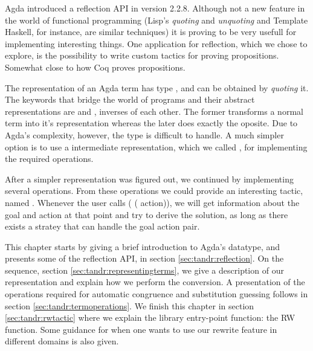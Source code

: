 
Agda introduced a reflection API in version 2.2.8. Although not a new feature
in the world of functional programming (Lisp's \emph{quoting} and \emph{unquoting} 
and Template Haskell, for instance, are similar techniques) 
it is proving to be very usefull for implementing interesting things. 
One application for reflection, which we chose to explore, is 
the possibility to write custom tactics for proving propositions. 
Somewhat close to how Coq proves propositions.

The representation of an Agda term has type , and can be obtained
by \emph{quoting} it.
The keywords that bridge the world of programs and their abstract representations 
are  and , inverses of each other. 
The former transforms a normal term into it's  representation whereas the 
later does exactly the oposite. Due to Agda's complexity, however, the type  is difficult
to handle. A much simpler option is to use a intermediate representation, which we called ,
for implementing the required operations.

After a simpler representation was figured out, we continued by implementing several
 operations. From these operations we could provide an interesting tactic,
named . Whenever the user calls ( ( action)), we will get information
about the goal and action at that point and try to derive the solution, as long as there exists
a stratey that can handle the goal action pair.

This chapter starts by giving a brief introduction to Agda's  datatype, and presents some
of the reflection API, in section \ref{sec:tandr:reflection}. 
On the sequence, section \ref{sec:tandr:representingterms}, we give a description of our  representation
and explain how we perform the conversion. A presentation of the operations required for 
automatic congruence and substitution guessing follows in section \ref{sec:tandr:termoperations}.
We finish this chapter in section \ref{sec:tandr:rwtactic} where we explain the library entry-point function: the RW function.
Some guidance for when one wants to use our rewrite feature in different domains is also given.
